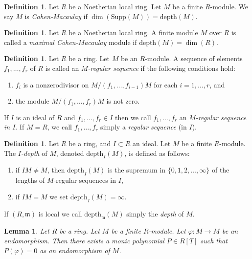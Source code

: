 \documentclass{amsart}
\theoremstyle{plain}
\newtheorem{lemma}[subsection]{Lemma}
\theoremstyle{definition}
\newtheorem{definition}[subsection]{Definition}
\theoremstyle{remark}
\numberwithin{equation}{subsection}
\begin{document}
\begin{definition}
\label{definition-CM}
Let $R$ be a Noetherian local ring.
Let $M$ be a finite $R$-module.
We say $M$ is {\it Cohen-Macaulay}
if $\dim(\text{Supp}(M)) = \text{depth}(M)$.
\end{definition}

\begin{definition}
\label{definition-maximal-CM}
Let $R$ be a Noetherian local ring.
A finite module $M$ over $R$ is called a {\it maximal Cohen-Macaulay}
module if $\text{depth}(M) = \dim(R)$.
\end{definition}

\begin{definition}
\label{definition-regular-sequence}
Let $R$ be a ring. Let $M$ be an $R$-module. A sequence of elements
$f_1, \ldots, f_r$ of $R$ is called an {\it $M$-regular sequence}
if the following conditions hold:
\begin{enumerate}
\item $f_i$ is a nonzerodivisor on
$M/(f_1, \ldots, f_{i - 1})M$
for each $i = 1, \ldots, r$, and
\item the module $M/(f_1, \ldots, f_r)M$ is not zero.
\end{enumerate}
If $I$ is an ideal of $R$ and $f_1, \ldots, f_r \in I$
then we call $f_1, \ldots, f_r$ an {\it $M$-regular sequence
in $I$}. If $M = R$, we call $f_1, \ldots, f_r$ simply a
{\it regular sequence} (in $I$).
\end{definition}

\begin{definition}
\label{definition-depth}
Let $R$ be a ring, and $I \subset R$ an ideal. Let $M$ be a finite $R$-module.
The {\it $I$-depth} of $M$, denoted $\text{depth}_I(M)$, is defined as follows:
\begin{enumerate}
\item if $IM \not = M$, then $\text{depth}_I(M)$ is the supremum in
$\{0, 1, 2, \ldots, \infty\}$ of the lengths of $M$-regular sequences in $I$,
\item if $IM = M$ we set $\text{depth}_I(M) = \infty$.
\end{enumerate}
If $(R, \mathfrak m)$ is local we call $\text{depth}_{\mathfrak m}(M)$ simply
the {\it depth} of $M$.
\end{definition}

\begin{lemma}
\label{lemma-charpoly-module}
Let $R$ be a ring.
Let $M$ be a finite $R$-module.
Let $\varphi : M \to M$ be an endomorphism.
Then there exists a monic polynomial $P \in R[T]$ such that
$P(\varphi) = 0$ as an endomorphism of $M$.
\end{lemma}
\end{document}
